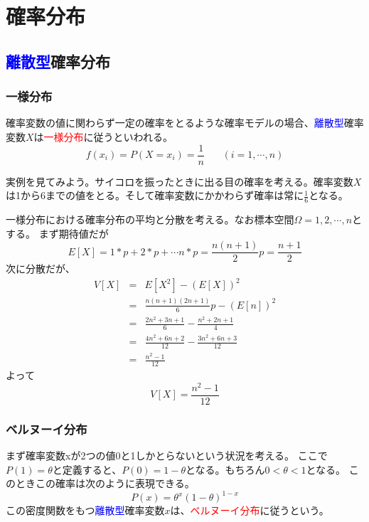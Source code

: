 \documentclass[a4paper,10pt]{jarticle}
\begin{document}
\section{確率分布}
\subsection{\textcolor{blue}{離散型}確率分布}
\subsubsection{一様分布}
確率変数の値に関わらず一定の確率をとるような確率モデルの場合、\textcolor{blue}{離散型}確率変数$X$は\textcolor{red}{一様分布}に従うといわれる。
\begin{equation}
    f(x_i) = P(X=x_i) = \frac{1}{n}\ \ \ \ \ \ \ \ (i=1,\cdots ,n)\tag{3,1}
\end{equation}

実例を見てみよう。サイコロを振ったときに出る目の確率を考える。確率変数$X$は1から6までの値をとる。そして確率変数にかかわらず確率は常に$\frac{1}{6}$となる。

一様分布における確率分布の平均と分散を考える。なお標本空間$\Omega={1,2,\cdots,n}$とする。
まず期待値だが
\begin{equation}
    E[X] = 1*p+2*p+\cdots n*p = \frac{n(n+1)}{2}p = \frac{n+1}{2}\tag{3,2}
\end{equation}
次に分散だが、
\begin{eqnarray*}
    V[X] &=& E[X^2]-(E[X])^2\\
    &=& \frac{n(n+1)(2n+1)}{6}p-(E[n])^2\\
    &=& \frac{2n^2+3n+1}{6}-\frac{n^2+2n+1}{4}\\
    &=& \frac{4n^2+6n+2}{12}-\frac{3n^2+6n+3}{12}\\
    &=&\frac{n^2-1}{12}
\end{eqnarray*}
よって
\begin{equation}
    V[X] = \frac{n^2-1}{12}\tag{3,3}
\end{equation}

\subsubsection{ベルヌーイ分布}
まず確率変数xが2つの値0と1しかとらないという状況を考える。
ここで$P(1)=\theta$と定義すると、$P(0)=1-\theta$となる。もちろん$0<\theta < 1$となる。
このときこの確率は次のように表現できる。
\begin{equation}
    P(x) = \theta^x (1-\theta)^{1-x}\tag{3,4}
\end{equation}
この密度関数をもつ\textcolor{blue}{離散型}確率変数$x$は、\textcolor{red}{ベルヌーイ分布}に従うという。
\end{document}
